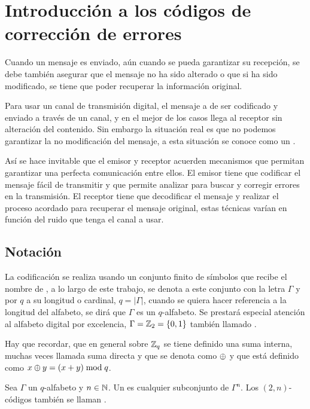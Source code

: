 \section{Introducción a los códigos de corrección de errores}

Cuando un mensaje es enviado, aún cuando se pueda garantizar su recepción, se debe también asegurar que el mensaje no ha sido alterado o que si ha sido modificado, se tiene que poder recuperar la información original.

Para usar un canal de transmisión digital, el mensaje a de ser codificado y enviado a través de un canal, y en el mejor de los casos llega al receptor sin alteración del contenido.
Sin embargo la situación real es que no podemos garantizar la no modificación del mensaje, a esta situación se conoce como un .

Así se hace invitable que el emisor y receptor acuerden mecanismos que permitan garantizar una perfecta comunicación entre ellos.
El emisor tiene que codificar el mensaje fácil de transmitir y que permite analizar para buscar y corregir errores en la transmisión.
El receptor tiene que decodificar el mensaje y realizar el proceso acordado para recuperar el mensaje original, estas técnicas varían en función del ruido que tenga el canal a usar.

\subsection{Notación}
La codificación se realiza usando un conjunto finito de símbolos que recibe el nombre de , a lo largo de este trabajo, se denota a este conjunto con la letra $\Gamma$ y por $q$ a su longitud o cardinal, $q=|\Gamma|$, cuando se quiera hacer referencia a la longitud del alfabeto, se dirá que $\Gamma$ es un $q$-alfabeto.
Se prestará especial atención al alfabeto digital por excelencia, $\Gamma = \mathbb{Z}_2 = \left\{0, 1\right\}$ también llamado .

Hay que recordar, que en general sobre $\mathbb{Z}_q$ se tiene definido una suma interna, muchas veces llamada suma directa y que se denota como $\oplus$ y que está definido como $x\oplus y = (x+y)\bmod q$.

\begin{definition}
	Sea $\Gamma$ un $q$-alfabeto y $n\in\mathbb{N}$.
	Un  es cualquier subconjunto de $\Gamma^n$.
	Los $(2, n)$-códigos también se llaman .
\end{definition}

